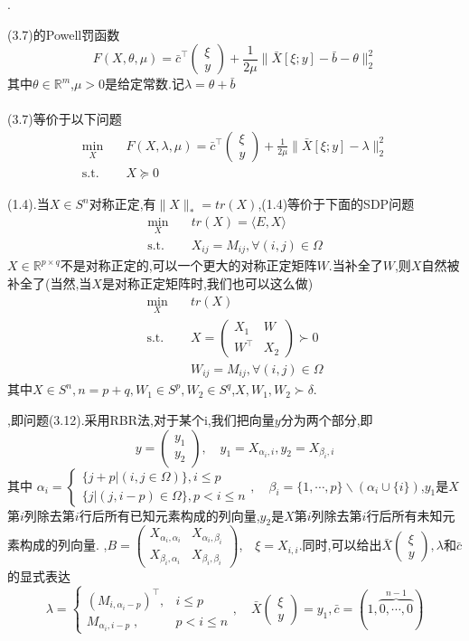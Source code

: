 \documentclass[UTF8]{ctexart}
\newcommand{\s}{\quad}
\newcommand{\p}{\paragraph{}\s}
\newcommand{\equSplit}[1]{\begin{equation}\begin{split}#1\end{split}\end{equation}}
\newcommand{\equ}[1]{\begin{equation}#1\end{equation}}
\newcommand{\Tst}{\text{s.t.}\s}
\newcommand{\norm}[1]{\lVert#1\rVert}
\newcommand{\inprod}[1]{\langle#1\rangle}
\newcommand{\Real}[1]{\mathbb{R}^{#1}}
\newcommand{\nunorm}{\norm{X}_*}
\newcommand{\pMa}[1]{\begin{pmatrix}#1\end{pmatrix}}
\numberwithin{equation}{section}
\begin{document}
		.

		(3.7)的Powell罚函数
		\equ{
			F(X,\theta,\mu)=\bar{c}^\top\pMa{\xi\\y}+\frac{1}{2\mu}\norm{\bar{X}[\xi;y]-\bar{b}-\theta}^2_2
		}
		其中$\theta\in\Real{m}$,$\mu>0$是给定常数.记$\lambda=\theta+\bar{b}$

		\p(3.7)等价于以下问题
		\equSplit{
			\min_{X}\s&F(X,\lambda,\mu)=\bar{c}^\top\pMa{\xi\\y}+\frac{1}{2\mu}\norm{\bar{X}[\xi;y]-\lambda}^2_2\\
			\Tst&X\succeq0
		}

		(1.4).当$X\in S^n$对称正定,有$\nunorm=tr(X)$,(1.4)等价于下面的SDP问题
		\equSplit{
			\min_X\s&tr(X)=\inprod{E,X}\\
			\Tst&X_{ij}=M_{ij},\forall(i,j)\in\Omega
		}
		$X\in\Real{p\times q}$不是对称正定的,可以一个更大的对称正定矩阵$W$.当补全了$W$,则$X$自然被补全了(当然,当$X$是对称正定矩阵时,我们也可以这么做)
		\equSplit{
			\min_X\s&tr(X)\\
			\Tst&X=\pMa{X_1&W\\W^\top&X_2}\succ0\\
			&W_{ij}=M_{ij},\forall(i,j)\in\Omega
		}
		其中$X\in S^{n},n=p+q,W_1\in S^p,W_2\in S^q$,$X,W_1,W_2\succ \delta$.

		,即问题(3.12).采用RBR法,对于某个i,我们把向量$y$分为两个部分,即
		\equ{y=\pMa{y_1\\y_2},\s y_1=X_{\alpha_i,i},y_2=X_{\beta_i,i}}
		其中
		$\alpha_i=
		\begin{cases}
			\{j+p\vert(i,j\in\Omega)\},i\leq p   \\
			\{j\vert(j,i-p)\in\Omega\},p<i\leq n
		\end{cases}
		,\s
		\beta_i=\{1,\cdots,p\}\backslash(\alpha_i\cup\{i\})$,$y_1$是$X$第$i$列除去第$i$行后所有已知元素构成的列向量,$y_2$是$X$第$i$列除去第$i$行后所有未知元素构成的列向量.
		,$B=\pMa{X_{\alpha_i,\alpha_i}&X_{\alpha_i,\beta_i}\\X_{\beta_i,\alpha_i}&X_{\beta_i,\beta_i}}$,$\s\xi=X_{i,i}$.同时,可以给出$\bar{X}\pMa{\xi\\y}, \lambda $和$\bar{c}$的显式表达
		\equ{
			\lambda =\begin{cases}
			(M_{i,\alpha_i-p})^\top,&i\leq p\\
			M_{\alpha_i,i-p}\;,&p<i\leq n
			\end{cases},\s
			\bar{X}\pMa{\xi\\y}=y_1,
			\bar{c}=(1,\overbrace{0,\cdots,0}^{n-1})
		}
\end{document}
